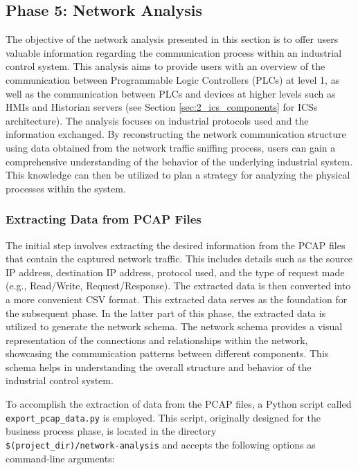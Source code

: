 \subsection{Phase 5: Network Analysis}
\label{subsec:4_network_analysis}
The objective of the network analysis presented in this section is to offer users valuable information regarding the communication process within an industrial control system. This analysis aims to provide users with an overview of the communication between Programmable Logic Controllers (PLCs) at level 1, as well as the communication between PLCs and devices at higher levels such as HMIs and Historian servers (see Section \ref{sec:2_ics_components} for ICSs architecture). The analysis focuses on industrial protocols used and the information exchanged.\newline
By reconstructing the network communication structure using data obtained from the network traffic sniffing process, users can gain a comprehensive understanding of the behavior of the underlying industrial system. This knowledge can then be utilized to plan a strategy for analyzing the physical processes within the system.

\subsubsection{Extracting Data from PCAP Files}
\label{subsubsec:4_extract_pcap}
The initial step involves extracting the desired information from the PCAP files that contain the captured network traffic. This includes details such as the source IP address, destination IP address, protocol used, and the type of request made (e.g., Read/Write, Request/Response). The extracted data is then converted into a more convenient CSV format. This extracted data serves as the foundation for the subsequent phase.\newline
In the latter part of this phase, the extracted data is utilized to generate the network schema. The network schema provides a visual representation of the connections and relationships within the network, showcasing the communication patterns between different components. This schema helps in understanding the overall structure and behavior of the industrial control system.

\bigskip
To accomplish the extraction of data from the PCAP files, a Python script called \texttt{export\_pcap\_data.py} is employed. This script, originally designed for the business process phase, is located in the directory\\ \texttt{\$(project\_dir)/network-analysis} and accepts the following options as command-line arguments:

